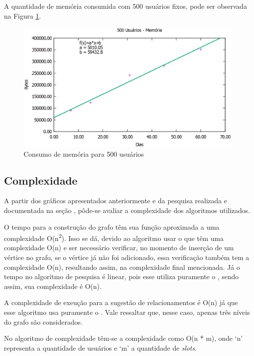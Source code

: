 A quantidade de memória consumida com 500 usuários fixos, pode ser observada na Figura \ref{500users_memoria}.

\newpage

\begin{figure}[!h]
	\centering
	\includegraphics[scale=0.55]{figuras/resultados/graficos/500_users_memoria.eps}
	\caption[Consumo de memória para 500 usuários]{Consumo de memória para 500 usuários}
	\label{500users_memoria}
\end{figure}

\subsection{Complexidade}

A partir dos gráficos apresentados anteriormente e da pesquisa realizada e documentada na seção , pôde-se avaliar a complexidade dos algoritmos utilizados.

O tempo para a construção do grafo têm sua função aproximada a uma complexidade O(n\textsuperscript{2}). Isso se dá, devido ao algoritmo usar o  que têm uma complexidade O(n) e ser necessário verificar, no momento de inserção de um vértice no grafo, se o vértice já não foi adicionado, essa verificação também tem a complexidade O(n), resultando assim, na complexidade final mencionada. Já o tempo no algoritmo de pesquisa é linear, pois esse utiliza puramente o , sendo assim, sua complexidade é O(n).

A complexidade de exeução para a sugestão de relacionamentos é O(n) já que esse algoritmo usa puramente o . Vale ressaltar que, nesse caso, apenas três níveis do grafo são considerados.

No algoritmo de complexidade têm-se a complexidade como O(n * m), onde `n' representa a quantidade de usuários e `m' a quantidade de \textit{slots}.

